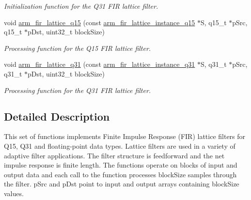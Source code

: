 \begin{DoxyCompactItemize}
\begin{DoxyCompactList}\small\item\em Initialization function for the Q31 F\-I\-R lattice filter. \end{DoxyCompactList}\item 
void \hyperlink{group___f_i_r___lattice_gabb0ab07fd313b4d863070c3ddca51542}{arm\-\_\-fir\-\_\-lattice\-\_\-q15} (const \hyperlink{structarm__fir__lattice__instance__q15}{arm\-\_\-fir\-\_\-lattice\-\_\-instance\-\_\-q15} $\ast$S, q15\-\_\-t $\ast$p\-Src, q15\-\_\-t $\ast$p\-Dst, uint32\-\_\-t block\-Size)
\begin{DoxyCompactList}\small\item\em Processing function for the Q15 F\-I\-R lattice filter. \end{DoxyCompactList}\item 
void \hyperlink{group___f_i_r___lattice_ga2e36fd210e4a1a5dd333ce80dd6d9a88}{arm\-\_\-fir\-\_\-lattice\-\_\-q31} (const \hyperlink{structarm__fir__lattice__instance__q31}{arm\-\_\-fir\-\_\-lattice\-\_\-instance\-\_\-q31} $\ast$S, q31\-\_\-t $\ast$p\-Src, q31\-\_\-t $\ast$p\-Dst, uint32\-\_\-t block\-Size)
\begin{DoxyCompactList}\small\item\em Processing function for the Q31 F\-I\-R lattice filter. \end{DoxyCompactList}\end{DoxyCompactItemize}


\subsection{Detailed Description}
This set of functions implements Finite Impulse Response (F\-I\-R) lattice filters for Q15, Q31 and floating-\/point data types. Lattice filters are used in a variety of adaptive filter applications. The filter structure is feedforward and the net impulse response is finite length. The functions operate on blocks of input and output data and each call to the function processes {\ttfamily block\-Size} samples through the filter. {\ttfamily p\-Src} and {\ttfamily p\-Dst} point to input and output arrays containing {\ttfamily block\-Size} values.

